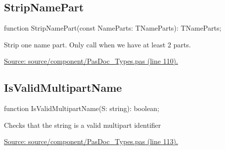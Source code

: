 \documentclass{report}
\newif\ifpdf
\begin{document}
\subsection*{StripNamePart}
\fi
\label{PasDoc_Types-StripNamePart}
\begin{list}{}{
\setlength{\itemindent}{0cm}
\setlength{\listparindent}{0cm}
\setlength{\leftmargin}{\evensidemargin}
\addtolength{\leftmargin}{\tmplength}
\settowidth{\labelsep}{X}
\addtolength{\leftmargin}{\labelsep}
\setlength{\labelwidth}{\tmplength}
}
\item[\textbf{Declaration}\hfill]
\ifpdf
\begin{flushleft}
\fi
\begin{ttfamily}
function StripNamePart(const NameParts: TNameParts): TNameParts;\end{ttfamily}

\ifpdf
\end{flushleft}
\fi

\par
\item[\textbf{Description}]
Strip one name part. Only call when we have at least 2 parts.\par
\href{https://github.com/pasdoc/pasdoc/blob/master/source/component/PasDoc_Types.pas#L110}{Source: source/component/PasDoc{\_}Types.pas (line 110).}

\end{list}
\ifpdf
\subsection*{\large{\textbf{IsValidMultipartName}}\normalsize\hspace{1ex}\hrulefill}
\else
\subsection*{IsValidMultipartName}
\fi
\label{PasDoc_Types-IsValidMultipartName}
\begin{list}{}{
\setlength{\itemindent}{0cm}
\setlength{\listparindent}{0cm}
\setlength{\leftmargin}{\evensidemargin}
\addtolength{\leftmargin}{\tmplength}
\settowidth{\labelsep}{X}
\addtolength{\leftmargin}{\labelsep}
\setlength{\labelwidth}{\tmplength}
}
\item[\textbf{Declaration}\hfill]
\ifpdf
\begin{flushleft}
\fi
\begin{ttfamily}
function IsValidMultipartName(S: string): boolean;\end{ttfamily}

\ifpdf
\end{flushleft}
\fi

\par
\item[\textbf{Description}]
Checks that the string is a valid multipart identifier\par
\href{https://github.com/pasdoc/pasdoc/blob/master/source/component/PasDoc_Types.pas#L113}{Source: source/component/PasDoc{\_}Types.pas (line 113).}

\end{list}
\ifpdf
\end{document}
